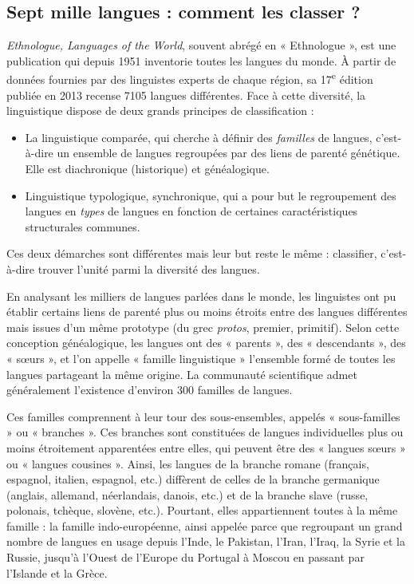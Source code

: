 \subsection{Sept mille langues : comment les classer ?}
\textit{Ethnologue, Languages of the World}, souvent abrégé en « Ethnologue », est une publication qui depuis 1951 inventorie toutes les langues du monde. À partir de données fournies par des linguistes experts de chaque région, sa 17\textsuperscript{e} édition publiée en 2013 recense 7105 langues différentes. Face à cette diversité, la linguistique dispose de deux grands principes de classification :
\begin{itemize}
\item La linguistique comparée, qui cherche à définir des \textit{familles} de langues, c’est-à-dire un ensemble de langues regroupées par des liens de parenté génétique. Elle est diachronique (historique) et généalogique.
\item Linguistique typologique, synchronique, qui a pour but le regroupement des langues en \textit{types} de langues en fonction de certaines caractéristiques structurales communes.
\end{itemize}
Ces deux démarches sont différentes mais leur but reste le même : classifier, c’est-à-dire trouver l’unité parmi la diversité des langues.

En analysant les milliers de langues parlées dans le monde, les linguistes ont pu établir certains liens de parenté plus ou moins étroits entre des langues différentes mais issues d’un même prototype (du grec \textit{protos}, premier, primitif). Selon cette conception généalogique, les langues ont des « parents », des « descendants », des « sœurs », et l’on appelle « famille linguistique » l’ensemble formé de toutes les langues partageant la même origine. La communauté scientifique admet généralement l’existence d’environ 300 familles de langues.

Ces familles comprennent à leur tour des sous-ensembles, appelés « sous-familles » ou « branches ». Ces branches sont constituées de langues individuelles plus ou moins étroitement apparentées entre elles, qui peuvent être des « langues sœurs » ou « langues cousines ». Ainsi, les langues de la branche romane (français, espagnol, italien, espagnol, etc.) diffèrent de celles de la branche germanique (anglais, allemand, néerlandais, danois, etc.) et de la branche slave (russe, polonais, tchèque, slovène, etc.). Pourtant, elles appartiennent toutes à la même famille : la famille indo-européenne, ainsi appelée parce que regroupant un grand nombre de langues en usage depuis l’Inde, le Pakistan, l’Iran, l’Iraq, la Syrie et la Russie, jusqu’à l’Ouest de l’Europe du Portugal à Moscou en passant par l’Islande et la Grèce.

